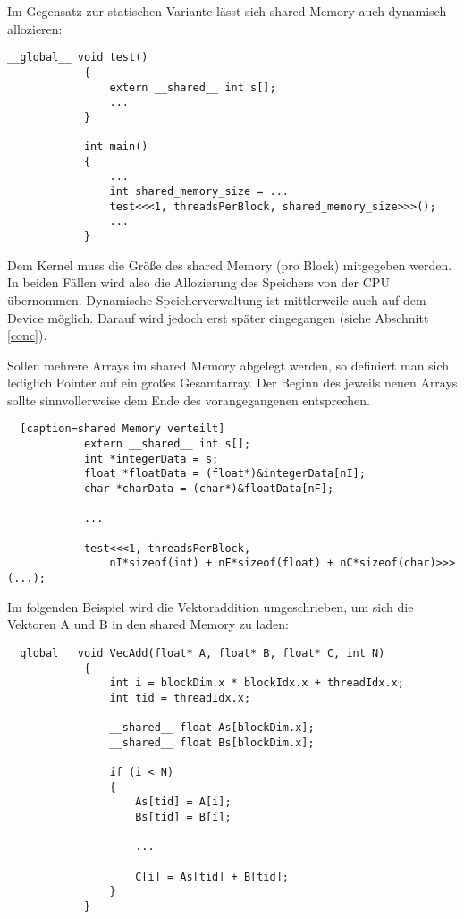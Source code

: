		Im Gegensatz zur statischen Variante lässt sich \gls{shared Memory} auch dynamisch allozieren:  		
  		\begin{lstlisting}[caption=shared Memory dynamisch]
			__global__ void test()
			{
  				extern __shared__ int s[];
  				...
			}
			
			int main()
			{
				...
				int shared_memory_size = ...
				test<<<1, threadsPerBlock, shared_memory_size>>>();
				...
			}			
  		\end{lstlisting}
  		
        Dem \Gls{Kernel} muss die Größe des \gls{shared Memory} (pro \Gls{Block}) mitgegeben werden. In beiden Fällen wird also die Allozierung des Speichers von der CPU übernommen.  Dynamische Speicherverwaltung ist mittlerweile auch auf dem Device möglich. Darauf wird jedoch erst später eingegangen (siehe Abschnitt \ref{conc}). 
        
        Sollen mehrere Arrays im \gls{shared Memory} abgelegt werden, so definiert man sich lediglich Pointer auf ein großes Gesamtarray. Der Beginn des jeweils neuen Arrays sollte sinnvollerweise dem Ende des vorangegangenen entsprechen.  	  		
  		\begin{lstlisting}	[caption=shared Memory verteilt]	
			extern __shared__ int s[];
			int *integerData = s;                        
			float *floatData = (float*)&integerData[nI];
			char *charData = (char*)&floatData[nF];
			
			...
			
			test<<<1, threadsPerBlock, 
				nI*sizeof(int) + nF*sizeof(float) + nC*sizeof(char)>>>(...);
		\end{lstlisting}

		Im folgenden Beispiel wird die Vektoraddition umgeschrieben, um sich die Vektoren A und B in den \gls{shared Memory} zu laden:	
		
		\begin{lstlisting}[caption=Vektoraddition shared Memory]
			__global__ void VecAdd(float* A, float* B, float* C, int N)
			{
    			int i = blockDim.x * blockIdx.x + threadIdx.x;
    			int tid = threadIdx.x;
    			
    			__shared__ float As[blockDim.x];
    			__shared__ float Bs[blockDim.x];
    			
    			if (i < N)
    			{
    			    As[tid] = A[i];
    			    Bs[tid] = B[i];
    			    
    			    ...
    			    
        			C[i] = As[tid] + B[tid];
        		}
			}
		\end{lstlisting}
		
